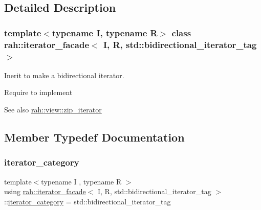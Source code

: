 \subsection{Detailed Description}
\subsubsection*{template$<$typename I, typename R$>$\newline
class rah\+::iterator\+\_\+facade$<$ I, R, std\+::bidirectional\+\_\+iterator\+\_\+tag $>$}

Inerit to make a bidirectional iterator. 

Require to implement 
\begin{DoxyCode}{0}
\end{DoxyCode}
 \begin{DoxySeeAlso}{See also}
\mbox{\hyperlink{structrah_1_1view_1_1zip__iterator}{rah\+::view\+::zip\+\_\+iterator}} 
\end{DoxySeeAlso}


\subsection{Member Typedef Documentation}
\mbox{\label{structrah_1_1iterator__facade_3_01_i_00_01_r_00_01std_1_1bidirectional__iterator__tag_01_4_a044a4ae4f097558e10b1d52b892a093a}} 
\subsubsection{\texorpdfstring{iterator\_category}{iterator\_category}}
{\footnotesize\ttfamily template$<$typename I , typename R $>$ \\
using \mbox{\hyperlink{structrah_1_1iterator__facade}{rah\+::iterator\+\_\+facade}}$<$ I, R, std\+::bidirectional\+\_\+iterator\+\_\+tag $>$\+::\mbox{\hyperlink{structrah_1_1iterator__facade_3_01_i_00_01_r_00_01std_1_1forward__iterator__tag_01_4_a3ed65491660beef4bd9488a3f511c934}{iterator\+\_\+category}} =  std\+::bidirectional\+\_\+iterator\+\_\+tag}



